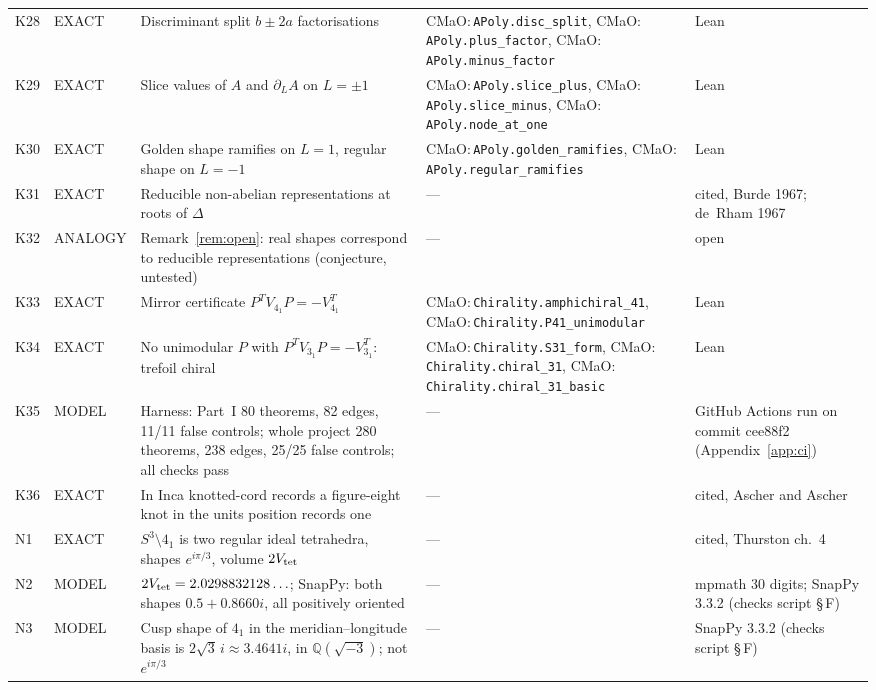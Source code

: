 \documentclass[11pt]{article}
\theoremstyle{definition}
\newcommand{\lean}[1]{\texttt{\small #1}}
\begin{document}
{\begin{longtable}{@{}L{0.05\textwidth}L{0.12\textwidth}L{0.26\textwidth}L{0.27\textwidth}L{0.17\textwidth}@{}}
K28 & EXACT & Discriminant split $b\pm2a$ factorisations & CMaO:\,\lean{APoly.\allowbreak{}disc\_\allowbreak{}split}, CMaO:\,\lean{APoly.\allowbreak{}plus\_\allowbreak{}factor}, CMaO:\,\lean{APoly.\allowbreak{}minus\_\allowbreak{}factor} & Lean\\
K29 & EXACT & Slice values of $A$ and $\partial_LA$ on $L=\pm1$ & CMaO:\,\lean{APoly.\allowbreak{}slice\_\allowbreak{}plus}, CMaO:\,\lean{APoly.\allowbreak{}slice\_\allowbreak{}minus}, CMaO:\,\lean{APoly.\allowbreak{}node\_\allowbreak{}at\_\allowbreak{}one} & Lean\\
K30 & EXACT & Golden shape ramifies on $L=1$, regular shape on $L=-1$ & CMaO:\,\lean{APoly.\allowbreak{}golden\_\allowbreak{}ramifies}, CMaO:\,\lean{APoly.\allowbreak{}regular\_\allowbreak{}ramifies} & Lean\\
K31 & EXACT & Reducible non-abelian representations at roots of $\Delta$ & --- & cited, Burde 1967; de~Rham 1967\\
K32 & ANALOGY & Remark~\ref{rem:open}: real shapes correspond to reducible representations (conjecture, untested) & --- & open\\
K33 & EXACT & Mirror certificate $P^TV_{4_1}P=-V_{4_1}^T$ & CMaO:\,\lean{Chirality.\allowbreak{}amphichiral\_\allowbreak{}41}, CMaO:\,\lean{Chirality.\allowbreak{}P41\_\allowbreak{}unimodular} & Lean\\
K34 & EXACT & No unimodular $P$ with $P^TV_{3_1}P=-V_{3_1}^T$: trefoil chiral & CMaO:\,\lean{Chirality.\allowbreak{}S31\_\allowbreak{}form}, CMaO:\,\lean{Chirality.\allowbreak{}chiral\_\allowbreak{}31}, CMaO:\,\lean{Chirality.\allowbreak{}chiral\_\allowbreak{}31\_\allowbreak{}basic} & Lean\\
K35 & MODEL & Harness: Part~I 80 theorems, 82 edges, 11/11 false controls; whole project 280 theorems, 238 edges, 25/25 false controls; all checks pass & --- & GitHub Actions run on commit cee88f2 (Appendix~\ref{app:ci})\\
K36 & EXACT & In Inca knotted-cord records a figure-eight knot in the units position records one & --- & cited, Ascher and Ascher\\
N1 & EXACT & $S^3\setminus4_1$ is two regular ideal tetrahedra, shapes $e^{i\pi/3}$, volume $2V_{\rm tet}$ & --- & cited, Thurston ch.~4\\
N2 & MODEL & $2V_{\rm tet}=2.0298832128\ldots$; SnapPy: both shapes $0.5+0.8660i$, all positively oriented & --- & mpmath 30 digits; SnapPy 3.3.2 (checks script \S\,F)\\
N3 & MODEL & Cusp shape of $4_1$ in the meridian--longitude basis is $2\sqrt3\,i\approx3.4641i$, in $\mathbb Q(\sqrt{-3})$; not $e^{i\pi/3}$ & --- & SnapPy 3.3.2 (checks script \S\,F)\\

\end{longtable}}
\end{document}
